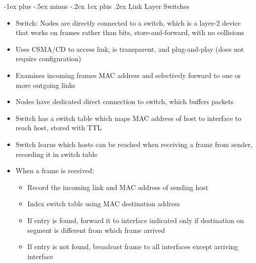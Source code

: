 \documentclass[10pt, landscape]{article}
\makeatletter
\renewcommand{\subsection}{\@startsection{subsection}{3}{0mm}%
                                {-1ex plus -.5ex minus -.2ex}%
                                {1ex plus .2ex}%
                                {\normalfont\small\bfseries}}%
\makeatother
\begin{document}
\begin{multicols*}{3}
\subsection{Link Layer Switches}
\begin{itemize}
    \item Switch: Nodes are directly connected to a switch, which is a layer-2 device that works on frames rather than bits, store-and-forward, with no collisions
    \item Uses CSMA/CD to access link, is transparent, and plug-and-play (does not require configuration)
    \item Examines incoming frames MAC address and selectively forward to one or more outgoing links
    \item Nodes have dedicated direct connection to switch, which buffers packets
    \item Switch has a switch table which maps MAC address of host to interface to reach host, stored with TTL
    \item Switch learns which hosts can be reached when receiving a frame from sender, recording it in switch table
    \item When a frame is received:
    \begin{itemize}
        \item Record the incoming link and MAC address of sending host
        \item Index switch table using MAC destination address
        \item If entry is found, forward it to interface indicated only if destination on segment is different from which frame arrived
        \item If entry is not found, broadcast frame to all interfaces except arriving interface
    \end{itemize}
\end{itemize}


\end{multicols*}
\end{document}
